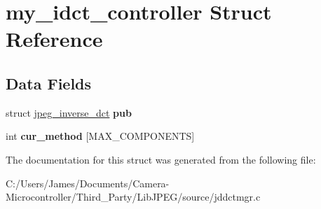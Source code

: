 \hypertarget{structmy__idct__controller}{}\section{my\+\_\+idct\+\_\+controller Struct Reference}
\label{structmy__idct__controller}
\subsection*{Data Fields}
\begin{DoxyCompactItemize}
\item 
\mbox{\label{structmy__idct__controller_aa4b3bf6471be325617d303f146c3d89a}} 
struct \hyperlink{structjpeg__inverse__dct}{jpeg\+\_\+inverse\+\_\+dct} {\bfseries pub}
\item 
\mbox{\label{structmy__idct__controller_a6e0b3983d799c0a65495acd99898af9e}} 
int {\bfseries cur\+\_\+method} \mbox{[}M\+A\+X\+\_\+\+C\+O\+M\+P\+O\+N\+E\+N\+TS\mbox{]}
\end{DoxyCompactItemize}


The documentation for this struct was generated from the following file\+:\begin{DoxyCompactItemize}
\item 
C\+:/\+Users/\+James/\+Documents/\+Camera-\/\+Microcontroller/\+Third\+\_\+\+Party/\+Lib\+J\+P\+E\+G/source/jddctmgr.\+c\end{DoxyCompactItemize}
